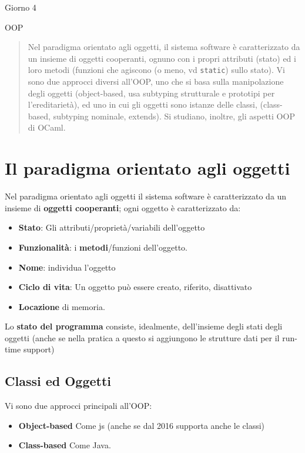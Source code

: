 \documentclass[a4paper,10pt]{article}
\begin{document}
\begin{center}
    \LARGE Giorno 4\smallskip

    \Large OOP
\end{center}\smallskip
\begin{abstract}
 Nel paradigma orientato agli oggetti, il sistema software è caratterizzato da un insieme di oggetti cooperanti, ognuno con i propri attributi (stato) ed i loro metodi (funzioni che agiscono (o meno, vd \texttt{static}) sullo stato). Vi sono due approcci diversi all'OOP, uno che si basa sulla manipolazione degli oggetti (object-based, usa subtyping strutturale e prototipi per l'ereditarietà), ed uno in cui gli oggetti sono istanze delle classi, (class-based, subtyping nominale, extends). Si studiano, inoltre, gli aspetti OOP di OCaml.
\end{abstract}

\section{Il paradigma orientato agli oggetti}

Nel paradigma orientato agli oggetti il sistema software è caratterizzato da un insieme di \textbf{oggetti cooperanti}; ogni oggetto è caratterizzato da:
\begin{itemize}
 \item \textbf{Stato}: Gli attributi/proprietà/variabili dell'oggetto
 \item \textbf{Funzionalità}: i \textbf{metodi}/funzioni dell'oggetto.
 \item \textbf{Nome}: individua l'oggetto
 \item \textbf{Ciclo di vita}: Un oggetto può essere creato, riferito, disattivato
 \item \textbf{Locazione} di memoria.
\end{itemize}

Lo \textbf{stato del programma} consiste, idealmente, dell'insieme degli stati degli oggetti (anche se nella pratica a questo si aggiungono le strutture dati per il run-time support)

\subsection{Classi ed Oggetti}
Vi sono due approcci principali all'OOP:
\begin{itemize}
 \item \textbf{Object-based} Come js (anche se dal 2016 supporta anche le classi)
 \item \textbf{Class-based} Come Java.
\end{itemize}
\end{document}
